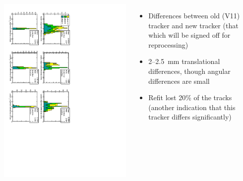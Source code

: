 \documentclass[compress]{beamer}
\begin{document}
\begin{frame}
\vfill
\begin{columns}
\includegraphics[height=\linewidth, angle=90]{hip_tracker_difference.pdf}
\begin{itemize}
\item Differences between old (V11) tracker and new tracker (that which will be signed off for reprocessing)
\item 2--2.5~mm translational differences, though angular differences are small
\item Refit lost 20\% of the tracks (another indication that this tracker differs significantly)
\end{itemize}
\end{columns}
\end{frame}
\end{document}

